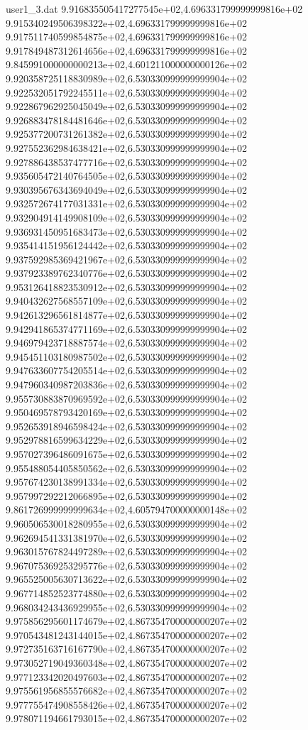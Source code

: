 \begin{filecontents}{user1_3.dat}
9.916835505417277545e+02,4.696331799999999816e+02
9.915340249506398322e+02,4.696331799999999816e+02
9.917511740599854875e+02,4.696331799999999816e+02
9.917849487312614656e+02,4.696331799999999816e+02
9.845991000000000213e+02,4.601211000000000126e+02
9.920358725118830989e+02,6.530330999999999904e+02
9.922532051792245511e+02,6.530330999999999904e+02
9.922867962925045049e+02,6.530330999999999904e+02
9.926883478184481646e+02,6.530330999999999904e+02
9.925377200731261382e+02,6.530330999999999904e+02
9.927552362984638421e+02,6.530330999999999904e+02
9.927886438537477716e+02,6.530330999999999904e+02
9.935605472140764505e+02,6.530330999999999904e+02
9.930395676343694049e+02,6.530330999999999904e+02
9.932572674177031331e+02,6.530330999999999904e+02
9.932904914149908109e+02,6.530330999999999904e+02
9.936931450951683473e+02,6.530330999999999904e+02
9.935414151956124442e+02,6.530330999999999904e+02
9.937592985369421967e+02,6.530330999999999904e+02
9.937923389762340776e+02,6.530330999999999904e+02
9.953126418823530912e+02,6.530330999999999904e+02
9.940432627568557109e+02,6.530330999999999904e+02
9.942613296561814877e+02,6.530330999999999904e+02
9.942941865374771169e+02,6.530330999999999904e+02
9.946979423718887574e+02,6.530330999999999904e+02
9.945451103180987502e+02,6.530330999999999904e+02
9.947633607754205514e+02,6.530330999999999904e+02
9.947960340987203836e+02,6.530330999999999904e+02
9.955730883870969592e+02,6.530330999999999904e+02
9.950469578793420169e+02,6.530330999999999904e+02
9.952653918946598424e+02,6.530330999999999904e+02
9.952978816599634229e+02,6.530330999999999904e+02
9.957027396486091675e+02,6.530330999999999904e+02
9.955488054405850562e+02,6.530330999999999904e+02
9.957674230138991334e+02,6.530330999999999904e+02
9.957997292212066895e+02,6.530330999999999904e+02
9.861726999999999634e+02,4.605794700000000148e+02
9.960506530018280955e+02,6.530330999999999904e+02
9.962694541331381970e+02,6.530330999999999904e+02
9.963015767824497289e+02,6.530330999999999904e+02
9.967075369253295776e+02,6.530330999999999904e+02
9.965525005630713622e+02,6.530330999999999904e+02
9.967714852523774880e+02,6.530330999999999904e+02
9.968034243436929955e+02,6.530330999999999904e+02
9.975856295601174679e+02,4.867354700000000207e+02
9.970543481243144015e+02,4.867354700000000207e+02
9.972735163716167790e+02,4.867354700000000207e+02
9.973052719049360348e+02,4.867354700000000207e+02
9.977123342020497603e+02,4.867354700000000207e+02
9.975561956855576682e+02,4.867354700000000207e+02
9.977755474908558426e+02,4.867354700000000207e+02
9.978071194661793015e+02,4.867354700000000207e+02

\end{filecontents}
